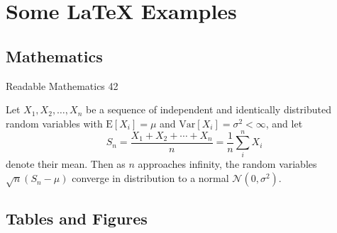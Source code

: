 \documentclass[10pt,xcolor={table,dvipsnames},t]{beamer}
\begin{document}
\section{Some \LaTeX{} Examples}

\subsection{Mathematics}

\begin{frame}{Readable Mathematics 42}

Let $X_1, X_2, \ldots, X_n$ be a sequence of independent and identically distributed random variables with $\text{E}[X_i] = \mu$ and $\text{Var}[X_i] = \sigma^2 < \infty$, and let
$$S_n = \frac{X_1 + X_2 + \cdots + X_n}{n}
      = \frac{1}{n}\sum_{i}^{n} X_i$$
denote their mean. Then as $n$ approaches infinity, the random variables $\sqrt{n}(S_n - \mu)$ converge in distribution to a normal $\mathcal{N}(0, \sigma^2)$.

\end{frame}

\subsection{Tables and Figures}

\smallframetitle
\end{document}
